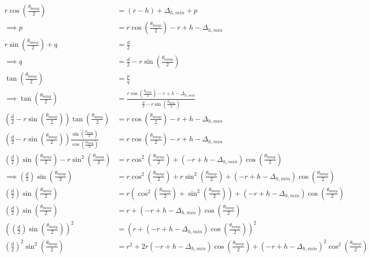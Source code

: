 \documentclass{article}
\begin{document}
	 \begin{align}
	 	r \cos \left({\frac{\theta_{bump}}{2}}\right) &= \left(r - h\right) + \Delta_{h, min} + p \\
	 	\implies p &= r \cos \left({\frac{\theta_{bump}}{2}}\right) - r + h - \Delta_{h, min} \\
	 	r \sin \left({\frac{\theta_{bump}}{2}}\right) + q &= \frac{d}{2} \\
	 	\implies q &= \frac{d}{2}  - r \sin \left({\frac{\theta_{bump}}{2}}\right) \\
	 	\tan \left({\frac{\theta_{bump}}{2}}\right) &= \frac{p}{q} \\
	 	\implies \tan \left({\frac{\theta_{bump}}{2}}\right) &= \frac{r \cos \left({\frac{\theta_{bump}}{2}}\right) - r + h - \Delta_{h, min}}{\frac{d}{2}  - r \sin \left({\frac{\theta_{bump}}{2}}\right)} \\
	 	\left(\frac{d}{2}  - r \sin \left({\frac{\theta_{bump}}{2}}\right)\right) \tan \left({\frac{\theta_{bump}}{2}}\right) &=  r \cos \left({\frac{\theta_{bump}}{2}}\right) - r + h - \Delta_{h, min} \\
	 	\left(\frac{d}{2}  - r \sin \left({\frac{\theta_{bump}}{2}}\right)\right) \frac{\sin \left({\frac{\theta_{bump}}{2}}\right)}{\cos \left({\frac{\theta_{bump}}{2}}\right)} &=  r \cos \left({\frac{\theta_{bump}}{2}}\right) - r + h - \Delta_{h, min} \\
	 	\left(\frac{d}{2}\right) \sin \left({\frac{\theta_{bump}}{2}}\right)  - r \sin^{2} \left({\frac{\theta_{bump}}{2}}\right) &=  r \cos^{2} \left({\frac{\theta_{bump}}{2}}\right) + \left(- r + h - \Delta_{h, min}\right) \cos \left({\frac{\theta_{bump}}{2}}\right) \\
	 	\implies \left(\frac{d}{2}\right) \sin \left({\frac{\theta_{bump}}{2}}\right) &=  r \cos^{2} \left({\frac{\theta_{bump}}{2}}\right) + r \sin^{2} \left({\frac{\theta_{bump}}{2}}\right) + \left(- r + h - \Delta_{h, min}\right) \cos \left({\frac{\theta_{bump}}{2}}\right) \\
	 	\left(\frac{d}{2}\right) \sin \left({\frac{\theta_{bump}}{2}}\right) &=  r \left(\cos^{2} \left({\frac{\theta_{bump}}{2}}\right) + \sin^{2} \left({\frac{\theta_{bump}}{2}}\right)\right) + \left(- r + h - \Delta_{h, min}\right) \cos \left({\frac{\theta_{bump}}{2}}\right) \\
	 	\left(\frac{d}{2}\right) \sin \left({\frac{\theta_{bump}}{2}}\right) &=  r + \left(- r + h - \Delta_{h, min}\right) \cos \left({\frac{\theta_{bump}}{2}}\right) \\
	 	\left(\left(\frac{d}{2}\right) \sin \left({\frac{\theta_{bump}}{2}}\right)\right)^{2} &=  \left(r + \left(- r + h - \Delta_{h, min}\right) \cos \left({\frac{\theta_{bump}}{2}}\right)\right)^{2} \\
	 	\left(\frac{d}{2}\right)^{2} \sin^{2} \left({\frac{\theta_{bump}}{2}}\right) &=  r^{2} + 2 r \left(- r + h - \Delta_{h, min}\right) \cos \left({\frac{\theta_{bump}}{2}}\right) + \left(- r + h - \Delta_{h, min}\right)^{2} \cos^{2} \left({\frac{\theta_{bump}}{2}}\right)
	 \end{align}
	 
\end{document}
